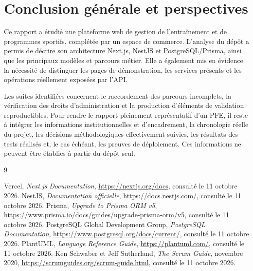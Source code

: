 ﻿\documentclass[12pt,a4paper]{report}
\begin{document}
\chapter*{Conclusion générale et perspectives}
Ce rapport a étudié une plateforme web de gestion de l'entraînement et de programmes sportifs, complétée par un espace de commerce. L'analyse du dépôt a permis de décrire son architecture Next.js, NestJS et PostgreSQL/Prisma, ainsi que les principaux modèles et parcours métier. Elle a également mis en évidence la nécessité de distinguer les pages de démonstration, les services présents et les opérations réellement exposées par l'API.

Les suites identifiées concernent le raccordement des parcours incomplets, la vérification des droits d'administration et la production d'éléments de validation reproductibles. Pour rendre le rapport pleinement représentatif d'un PFE, il reste à intégrer les informations institutionnelles et d'encadrement, la chronologie réelle du projet, les décisions méthodologiques effectivement suivies, les résultats des tests réalisés et, le cas échéant, les preuves de déploiement. Ces informations ne peuvent être établies à partir du dépôt seul.

\renewcommand{\bibname}{Webographie}
\begin{thebibliography}{9}
 Vercel, \emph{Next.js Documentation}, \url{https://nextjs.org/docs}, consulté le 11 octobre 2026.
 NestJS, \emph{Documentation officielle}, \url{https://docs.nestjs.com/}, consulté le 11 octobre 2026.
 Prisma, \emph{Upgrade to Prisma ORM v5}, \url{https://www.prisma.io/docs/guides/upgrade-prisma-orm/v5}, consulté le 11 octobre 2026.
 PostgreSQL Global Development Group, \emph{PostgreSQL Documentation}, \url{https://www.postgresql.org/docs/current/}, consulté le 11 octobre 2026.
 PlantUML, \emph{Language Reference Guide}, \url{https://plantuml.com/}, consulté le 11 octobre 2026.
 Ken Schwaber et Jeff Sutherland, \emph{The Scrum Guide}, novembre 2020, \url{https://scrumguides.org/scrum-guide.html}, consulté le 11 octobre 2026.
\end{thebibliography}
\end{document}
